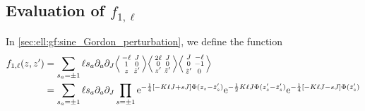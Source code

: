 \subsection{Evaluation of \texorpdfstring{$f_{1,\ell}$}{f1ell}}\label{sec:app:algebra:eval_f_1_ell}
In \autoref{sec:ell:gf:sine_Gordon_perturbation}, we define the function
\begin{align*}
f_{1,\ell}(z,z') &= \sum_{s_a=\pm 1} \ell s_a\partial_a \partial_J \bra*{\abx{-\ell&J}{1&0}{z&\tilde{z}'}} \bra*{\abx{2\ell&J}{0&0}{z'&\tilde{z}'}} \bra*{\abx{J&-\ell}{0&-1}{\tilde{z}'&0}}\\
&= \sum_{s_a=\pm 1} \ell s_a\partial_a \partial_J \prod_{s=\pm 1} \powe{-\frac{1}{4} \klb*{-K\ell J + sJ} \Phi(z_{s} - \tilde{z}_{s}')}  \powe{-\frac{1}{2} K\ell J \Phi(z_{s}' - \tilde{z}_{s}')} \powe{-\frac{1}{4} \klb*{-K\ell J - s J} \Phi(\tilde{z}_{s}')}
\end{align*}
